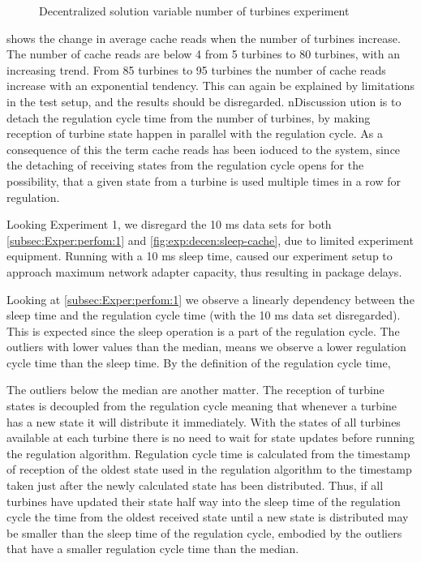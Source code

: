\begin{figure}[h!]
	\centering
	
	\caption{Decentralized solution variable number of turbines experiment}

\end{figure}


 shows the change in average cache reads when the number of turbines increase. The number of cache reads are below 4 from 5 turbines to 80 turbines, with an increasing trend. From 85 turbines to 95 turbines the number of cache reads increase with an exponential tendency. This can again be explained by limitations in the test setup, and the results should be disregarded.
        n{Discussion}                                 ution is to detach the regulation cycle time from the number of turbines, by making reception of turbine state happen in parallel with the regulation cycle. As a consequence of this the term cache reads has been ioduced to the system, since the detaching of receiving states from the regulation cycle opens for the possibility, that a given state from a turbine is used multiple times in a row for regulation. 

Looking Experiment 1, we disregard the 10 ms data sets for both \cref{subsec:Exper:perfom:1} and \cref{fig:exp:decen:sleep-cache}, due to limited experiment equipment. Running with a 10 ms sleep time, caused our experiment setup to approach maximum network adapter capacity, thus resulting in package delays.

Looking at \cref{subsec:Exper:perfom:1} we observe a linearly dependency between the sleep time and the regulation cycle time (with the 10 ms data set disregarded). This is expected since the sleep operation is a part of the regulation cycle. The outliers with lower values than the median, means we observe a lower regulation cycle time than the sleep time. By the definition of the regulation cycle time,  



The outliers below the median are another matter. The reception of turbine states is decoupled from the regulation cycle meaning that whenever a turbine has a new state it will distribute it immediately. With the states of all turbines available at each turbine there is no need to wait for state updates before running the regulation algorithm. Regulation cycle time is calculated from the timestamp of reception of the oldest state used in the regulation algorithm to the timestamp taken just after the newly calculated state has been distributed. Thus, if all turbines have updated their state half way into the sleep time of the regulation cycle the time from the oldest received state until a new state is distributed may be smaller than the sleep time of the regulation cycle, embodied by the outliers that have a smaller regulation cycle time than the median.



